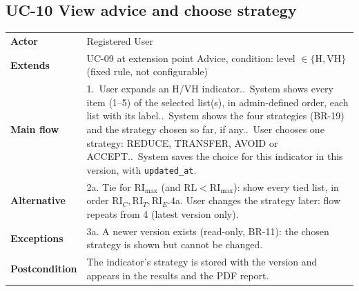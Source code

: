 \documentclass[11pt,a4paper]{article}
\newcommand{\RL}{\mathrm{RL}}
\newcommand{\RIC}{\mathrm{RI}_{C}}
\newcommand{\RIT}{\mathrm{RI}_{T}}
\newcommand{\RIE}{\mathrm{RI}_{E}}
\newcommand{\RImax}{\mathrm{RI}_{\max}}
\begin{document}
\noindent\begin{minipage}{\linewidth}
\subsection*{UC-10 View advice and choose strategy}
\begin{tabularx}{\linewidth}{@{}>{\raggedright\leavevmode\bfseries\color{creBlue}}p{2.6cm} Y@{}}
\toprule
Actor & Registered User \\
Extends & UC-09 at extension point Advice, condition: level $\in\{\mathrm{H},\mathrm{VH}\}$ (fixed rule, not configurable) \\
Main flow & 1.~User expands an H/VH indicator..~System shows every item (1--5) of the selected list(s), in admin-defined order, each list with its label..~System shows the four strategies (BR-19) and the strategy chosen so far, if any..~User chooses one strategy: REDUCE, TRANSFER, AVOID or ACCEPT..~System saves the choice for this indicator in this version, with \texttt{updated\_at}. \\
Alternative & 2a. Tie for $\RImax$ (and $\RL < \RImax$): show every tied list, in order $\RIC,\RIT,\RIE$.\newline 4a. User changes the strategy later: flow repeats from 4 (latest version only). \\
Exceptions & 3a. A newer version exists (read-only, BR-11): the chosen strategy is shown but cannot be changed. \\
Postcondition & The indicator's strategy is stored with the version and appears in the results and the PDF report. \\
\bottomrule
\end{tabularx}
\end{minipage}
\par\medskip
\end{document}
